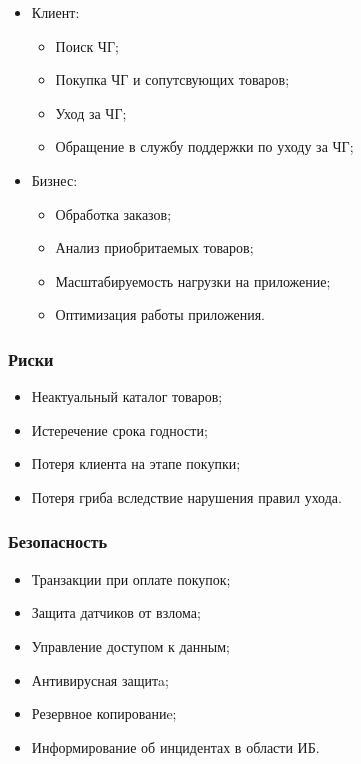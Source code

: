 \documentclass[a4paper,8pt]{article}
\begin{document}
    \begin{itemize}
        \item Клиент:
            \begin{itemize}
                \item Поиск ЧГ;
                \item Покупка ЧГ и сопутсвующих товаров;
                \item Уход за ЧГ;
                \item Обращение в службу поддержки по уходу за ЧГ;
            \end{itemize}
        \item Бизнес:
            \begin{itemize}
                \item Обработка заказов;
                \item Анализ приобритаемых товаров;
                \item Масштабируемость нагрузки на приложение;
                \item Оптимизация работы приложения.
            \end{itemize}
    \end{itemize}

\subsubsection{Риски}

    \begin{itemize}
        \item Неактуальный каталог товаров;
        \item Истеречение срока годности;
        \item Потеря клиента на этапе покупки;
        \item Потеря гриба вследствие нарушения правил ухода.
    \end{itemize}

\subsubsection{Безопасность}

    \begin{itemize}
        \item Транзакции при оплате покупок;
        \item Защита датчиков от взлома;
        \item Управление доступом к данным; 
        \item Антивирусная защитa;
        \item Резервное копированиe; 
        \item Информирование об инцидентах в области ИБ.
    \end{itemize}
\end{document}
